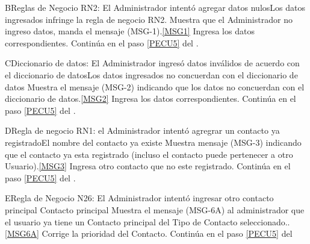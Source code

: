         \begin{UCtrayectoriaA}{B}{Reglas de Negocio RN2: El Administrador intentó agregar datos nulos}{Los datos ingresados infringe la regla de negocio RN2.}
                        \UCpaso Muestra que el Administrador no ingreso datos, manda el mensaje (MSG-1).\ref{MSG1}
			\UCpaso[\UCactor] Ingresa los datos correspondientes.
			\UCpaso Continúa en el paso \ref{PECU5} del .
	\end{UCtrayectoriaA}

        \begin{UCtrayectoriaA}{C}{Diccionario de datos: El Administrador ingresó datos inválidos de acuerdo con el diccionario de datos}{Los datos ingresados no concuerdan con el diccionario de datos}
                        \UCpaso Muestra el mensaje (MSG-2) indicando que los datos no concuerdan con el diccionario de datos.\ref{MSG2}
			\UCpaso[\UCactor] Ingresa los datos correspondientes.
			\UCpaso Continúa en el paso \ref{PECU5} del .
	\end{UCtrayectoriaA}

        \begin{UCtrayectoriaA}{D}{Regla de negocio RN1: el Administrador intentó agregrar un contacto ya registrado}{El nombre del contacto ya existe}
                        \UCpaso Muestra mensaje (MSG-3) indicando que el contacto ya esta registrado (incluso el contacto puede pertenecer a otro Usuario).\ref{MSG3}
			\UCpaso[\UCactor] Ingresa otro contacto que no este registrado.
			\UCpaso Continúa en el paso \ref{PECU5} del .
	\end{UCtrayectoriaA}

        \begin{UCtrayectoriaA}{E}{Regla de Negocio N26: El Administrador intentó ingresar otro contacto principal }{Contacto principal}
                        \UCpaso Muestra el mensaje (MSG-6A) al administrador que el usuario ya tiene un Contacto principal del Tipo de Contacto seleccionado..\ref{MSG6A}
			\UCpaso[\UCactor] Corrige la prioridad del Contacto.
			\UCpaso Continúa en el paso \ref{PECU5} del 
	\end{UCtrayectoriaA}

